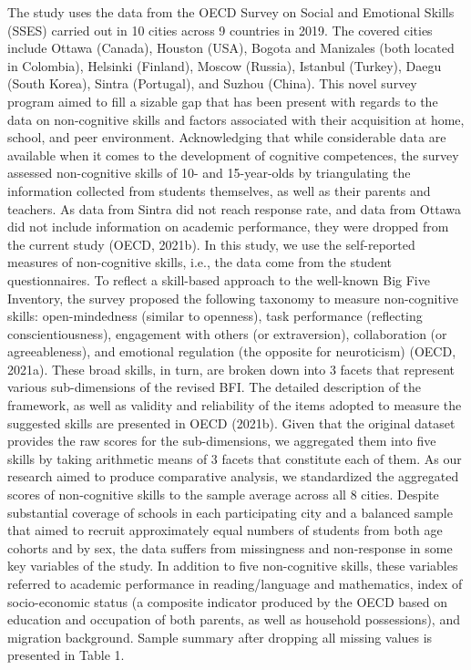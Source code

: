 \documentclass[
  12pt,
  a4paper,
]{article}
\begin{document}
The study uses the data from the OECD Survey on Social and Emotional
Skills (SSES) carried out in 10 cities across 9 countries in 2019. The
covered cities include Ottawa (Canada), Houston (USA), Bogota and
Manizales (both located in Colombia), Helsinki (Finland), Moscow
(Russia), Istanbul (Turkey), Daegu (South Korea), Sintra (Portugal), and
Suzhou (China). This novel survey program aimed to fill a sizable gap
that has been present with regards to the data on non-cognitive skills
and factors associated with their acquisition at home, school, and peer
environment. Acknowledging that while considerable data are available
when it comes to the development of cognitive competences, the survey
assessed non-cognitive skills of 10- and 15-year-olds by triangulating
the information collected from students themselves, as well as their
parents and teachers. As data from Sintra did not reach response rate,
and data from Ottawa did not include information on academic
performance, they were dropped from the current study (OECD, 2021b). In
this study, we use the self-reported measures of non-cognitive skills,
i.e., the data come from the student questionnaires. To reflect a
skill-based approach to the well-known Big Five Inventory, the survey
proposed the following taxonomy to measure non-cognitive skills:
open-mindedness (similar to openness), task performance (reflecting
conscientiousness), engagement with others (or extraversion),
collaboration (or agreeableness), and emotional regulation (the opposite
for neuroticism) (OECD, 2021a). These broad skills, in turn, are broken
down into 3 facets that represent various sub-dimensions of the revised
BFI. The detailed description of the framework, as well as validity and
reliability of the items adopted to measure the suggested skills are
presented in OECD (2021b). Given that the original dataset provides the
raw scores for the sub-dimensions, we aggregated them into five skills
by taking arithmetic means of 3 facets that constitute each of them. As
our research aimed to produce comparative analysis, we standardized the
aggregated scores of non-cognitive skills to the sample average across
all 8 cities. Despite substantial coverage of schools in each
participating city and a balanced sample that aimed to recruit
approximately equal numbers of students from both age cohorts and by
sex, the data suffers from missingness and non-response in some key
variables of the study. In addition to five non-cognitive skills, these
variables referred to academic performance in reading/language and
mathematics, index of socio-economic status (a composite indicator
produced by the OECD based on education and occupation of both parents,
as well as household possessions), and migration background. Sample
summary after dropping all missing values is presented in Table 1.
\end{document}
